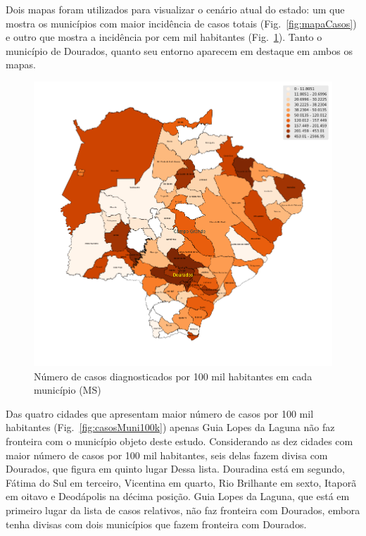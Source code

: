 \documentclass[12pt]{article}
\begin{document}
Dois mapas foram utilizados para visualizar o cenário atual do estado: um que mostra os municípios com maior incidência de casos totais (Fig.~\ref{fig:mapaCasos}) e outro que mostra a incidência por cem mil habitantes (Fig.~\ref{fig:mapa100K}). Tanto o município de Dourados, quanto seu entorno aparecem em destaque em ambos os mapas.

\begin{figure}[!htb]
    \centering
    \includegraphics[width=1\textwidth]{figs/mapa_casos_100_mil.png}
    \caption{Número de casos diagnosticados por 100 mil habitantes em cada município (MS)}
    \label{fig:mapa100K}
    \end{figure}
  
Das quatro cidades que apresentam maior número de casos por 100 mil habitantes (Fig.~\ref{fig:casosMuni100k}) apenas Guia Lopes da Laguna não faz fronteira com o município objeto deste estudo. Considerando as dez cidades com maior número de casos por 100 mil habitantes, seis delas fazem divisa com Dourados, que figura em quinto lugar Dessa lista. Douradina está em segundo, Fátima do Sul em terceiro, Vicentina em quarto, Rio Brilhante em sexto, Itaporã em oitavo e Deodápolis na décima posição. Guia Lopes da Laguna, que está em primeiro lugar da lista de casos relativos, não faz fronteira com Dourados, embora tenha divisas com dois municípios que fazem fronteira com Dourados.
\end{document}
